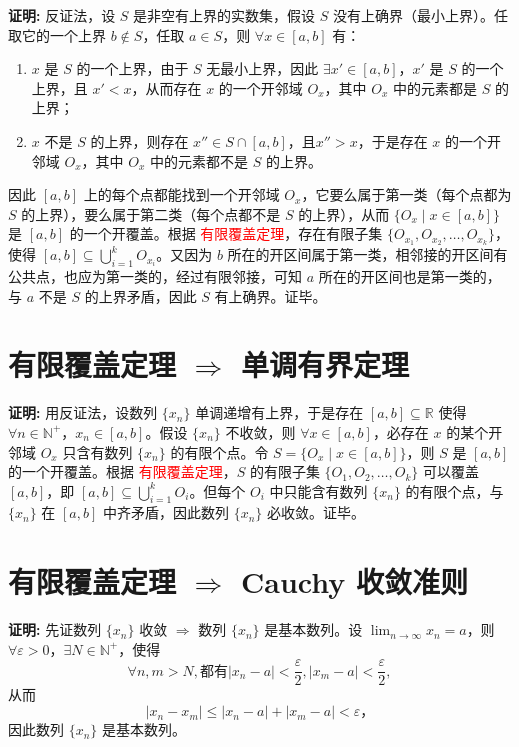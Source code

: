 \documentclass[lang=cn,newtx,10pt,scheme=chinese]{elegantbook}
\begin{document}
\textbf{证明:} 反证法，设 $S$ 是非空有上界的实数集，假设 $S$ 没有上确界（最小上界）。任取它的一个上界 $b \notin S$，任取 $a \in S$，则 $\forall x \in [a, b]$ 有：
\begin{enumerate}
    \item $x$ 是 $S$ 的一个上界，由于 $S$ 无最小上界，因此 $\exists x' \in [a, b]$，$x'$ 是 $S$ 的一个上界，且 $x' < x$，从而存在 $x$ 的一个开邻域 $O_x$，其中 $O_x$ 中的元素都是 $S$ 的上界；
    \item $x$ 不是 $S$ 的上界，则存在 $x'' \in S \cap [a, b]，且 x'' > x$，于是存在 $x$ 的一个开邻域 $O_x$，其中 $O_x$ 中的元素都不是 $S$ 的上界。
\end{enumerate}

因此 $[a, b]$ 上的每个点都能找到一个开邻域 $O_x$，它要么属于第一类（每个点都为 $S$ 的上界），要么属于第二类（每个点都不是 $S$ 的上界），从而 $\{O_x \mid x \in [a, b]\}$ 是 $[a, b]$ 的一个开覆盖。根据 \textcolor{red}{有限覆盖定理}，存在有限子集 $\{O_{x_1}, O_{x_2}, \ldots, O_{x_k}\}$，使得 $[a, b] \subseteq \bigcup_{i=1}^{k} O_{x_i}$。又因为 $b$ 所在的开区间属于第一类，相邻接的开区间有公共点，也应为第一类的，经过有限邻接，可知 $a$ 所在的开区间也是第一类的，与 $a$ 不是 $S$ 的上界矛盾，因此 $S$ 有上确界。证毕。



\section*{有限覆盖定理 $\Rightarrow$ 单调有界定理}

\textbf{证明:} 用反证法，设数列 $\{x_n\}$ 单调递增有上界，于是存在 $[a, b] \subseteq \mathbb{R}$ 使得 $\forall n \in \mathbb{N}^+$，$x_n \in [a, b]$。假设 $\{x_n\}$ 不收敛，则 $\forall x \in [a, b]$，必存在 $x$ 的某个开邻域 $O_x$ 只含有数列 $\{x_n\}$ 的有限个点。令 $S = \{O_x \mid x \in [a, b]\}$，则 $S$ 是 $[a, b]$ 的一个开覆盖。根据 \textcolor{red}{有限覆盖定理}，$S$ 的有限子集 $\{O_1, O_2, \ldots, O_k\}$ 可以覆盖 $[a, b]$，即 $[a, b] \subseteq \bigcup_{i=1}^{k} O_i$。但每个 $O_i$ 中只能含有数列 $\{x_n\}$ 的有限个点，与 $\{x_n\}$ 在 $[a, b]$ 中齐矛盾，因此数列 $\{x_n\}$ 必收敛。证毕。

\section*{有限覆盖定理 $\Rightarrow$ Cauchy 收敛准则}

\textbf{证明:} 先证数列 $\{x_n\}$ 收敛 $\Rightarrow$ 数列 $\{x_n\}$ 是基本数列。设 $\lim_{n \to \infty} x_n = a$，则 $\forall \varepsilon > 0$，$\exists N \in \mathbb{N}^+$，使得
\[
\forall n, m > N, \text{都有} |x_n - a| < \frac{\varepsilon}{2}, |x_m - a| < \frac{\varepsilon}{2},
\]
从而
\[
|x_n - x_m| \leq |x_n - a| + |x_m - a| < \varepsilon，
\]
因此数列 $\{x_n\}$ 是基本数列。
\end{document}
